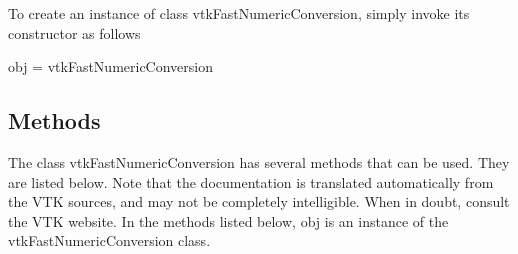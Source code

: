 To create an instance of class vtk\-Fast\-Numeric\-Conversion, simply invoke its constructor as follows \begin{DoxyVerb}  obj = vtkFastNumericConversion
\end{DoxyVerb}
 \hypertarget{vtkwidgets_vtkxyplotwidget_Methods}{}\subsection{Methods}\label{vtkwidgets_vtkxyplotwidget_Methods}
The class vtk\-Fast\-Numeric\-Conversion has several methods that can be used. They are listed below. Note that the documentation is translated automatically from the V\-T\-K sources, and may not be completely intelligible. When in doubt, consult the V\-T\-K website. In the methods listed below, {\ttfamily obj} is an instance of the vtk\-Fast\-Numeric\-Conversion class. 
